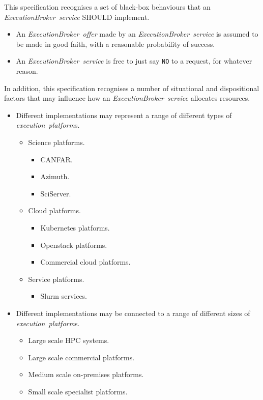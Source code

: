 \documentclass[11pt,a4paper]{ivoa}
\newcommand{\execbrokerservice}[1] {\textit{ExecutionBroker~service#1}}
\newcommand{\execoffer}[1] {\textit{ExecutionBroker~offer#1}}
\newcommand{\execplatform} {\textit{execution~platform}}
\newcommand{\codeword}[1] {\texttt{#1}}
\begin{document}
This specification recognises a set of black-box behaviours that an \execbrokerservice{} SHOULD implement.

\begin{itemize}
    \item An \execoffer{} made by an \execbrokerservice{} is assumed to be made in good faith, with a reasonable probability of success.
    \item An \execbrokerservice{} is free to just say \codeword{NO} to a request, for whatever reason.
\end{itemize}

In addition, this specification recognises a number of situational and dispositional factors
that may influence how an \execbrokerservice{} allocates resources.

\begin{itemize}
    \item Different implementations may represent a range of different types of \execplatform{s}.
    \begin{itemize}
        \item Science platforms.
        \begin{itemize}
            \item CANFAR.
            \item Azimuth.
            \item SciServer.
        \end{itemize}
        \item Cloud platforms.
        \begin{itemize}
            \item Kubernetes platforms.
            \item Openstack platforms.
            \item Commercial cloud platforms.
        \end{itemize}
        \item Service platforms.
        \begin{itemize}
            \item Slurm services.
        \end{itemize}
    \end{itemize}

    \item Different implementations may be connected to a range of different sizes of \execplatform{s}.
    \begin{itemize}
        \item Large scale HPC systems.
        \item Large scale commercial platforms.
        \item Medium scale on-premises platforms.
        \item Small scale specialist platforms.
    \end{itemize}


\end{itemize}
\end{document}
